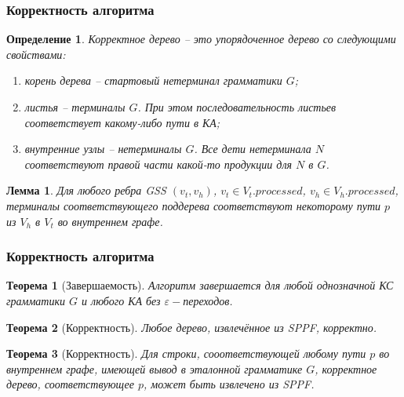 \documentclass{beamer}
\newtheorem{rutheorem}{Теорема}
\newtheorem{rudefinition}{Определение}
\newtheorem{rulemma}{Лемма}
\begin{document}
\begin{frame}
    \transwipe[direction=90]
    \frametitle{Корректность алгоритма}
    \begin{rudefinition}
         \emph{Корректное дерево} -- это упорядоченное дерево со следующими свойствами:
        \begin{enumerate}
            \item корень дерева -- стартовый нетерминал грамматики $G$;
            \item листья --  терминалы $G$. При этом последовательность листьев соответствует 
            какому-либо пути в КА;
            \item внутренние узлы -- нетерминалы $G$. Все дети нетерминала $N$ соответствуют правой части какой-то продукции для $N$ в $G$.
        \end{enumerate}
    \end{rudefinition}
    \begin{rulemma}
       Для любого ребра GSS $(v_{t}, v_{h})$, $v_{t} \in V_{t}.processed$, $v_{h} \in V_{h}.processed$, терминалы соответствующего поддерева соответствуют некоторому пути $p$ из $V_{h}$ в $V_{t}$ во внутреннем графе.
    \end{rulemma}

\end{frame}

\begin{frame}
    \transwipe[direction=90]
    \frametitle{Корректность алгоритма}
    \begin{rutheorem}[Завершаемость]
             Алгоритм завершается для любой однозначной КС грамматики $G$ и любого КА без $\varepsilon-$переходов.
    \end{rutheorem}

    \begin{rutheorem}[Корректность]
       Любое дерево, извлечённое из SPPF, корректно.
    \end{rutheorem}

    \begin{rutheorem}[Корректность]
      Для строки, сооответствующей любому пути $p$ во внутреннем графе, имеющей вывод в эталонной грамматике $G$, корректное дерево, соответствующее $p$, может быть извлечено из SPPF.
    \end{rutheorem}

\end{frame}
\end{document}
